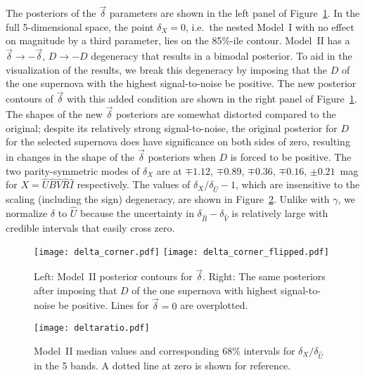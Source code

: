 \documentclass{aastex61}   	%
\begin{document}
The posteriors of the $\vec{\delta}$ parameters are shown  in
the left panel of
Figure~\ref{deltacorner:fig}.
In the full 5-dimensional space,
the point $\delta_X=0$, i.e.\ the nested Model~I with no effect on magnitude by a third parameter,  lies on the 85\%-ile contour.
Model~II has a  $\vec{\delta} \rightarrow -\vec{\delta}$, $D \rightarrow -D$ degeneracy that results in a bimodal posterior.
To aid in the visualization of the results,
we break this degeneracy by imposing  that the $D$ of the one supernova with the highest signal-to-noise be positive.
The new posterior contours of $\vec{\delta}$ with this added
condition are shown in 
the right panel of
Figure~\ref{deltacorner:fig}.
The shapes of the new $\vec{\delta}$ posteriors are somewhat distorted compared to the original;
despite its relatively strong signal-to-noise, the original posterior for $D$ for the selected supernova does have significance on both sides of zero,
resulting in changes in the shape of the $\vec{\delta}$ posteriors when  $D$ is forced to be positive.   
The 
two parity-symmetric
modes of $\delta_X$ are at $\mp 1.12$, $\mp 0.89$, $\mp 0.36$,  $\mp0.16$, $\pm0.21$~mag
for $X={\hat{U}}{\hat{B}}{\hat{V}}{\hat{R}}{\hat{I}}$ respectively.
The values of $\delta_X/\delta_{\hat{U}}-1$, which are insensitive to the scaling (including the sign) degeneracy, are shown in Figure~\ref{deltaratio:fig}.
Unlike with $\gamma$, we normalize $\delta$ to $\hat{U}$ because the uncertainty in $\delta_{\hat{B}}-\delta_{\hat{V}}$ is relatively large with
credible intervals that easily cross zero. 

\begin{figure}[htbp] %
   \centering
   \texttt{[image: delta\_corner.pdf]}
     \texttt{[image: delta\_corner\_flipped.pdf]}
   \caption{Left:  Model~II posterior contours for $\vec{\delta}$.
   Right: The same posteriors after imposing that $D$ of the one supernova with highest signal-to-noise be positive.
     Lines for $\vec{\delta}=0$ are overplotted.
   \label{deltacorner:fig}}
\end{figure}


\begin{figure}[htbp] %
   \centering
      \texttt{[image: deltaratio.pdf]}
   \caption{Model~II median values  and corresponding 68\% intervals for $\delta_X/\delta_{\hat{U}}$ in the 5 bands.
   A dotted line at zero is shown for reference.
   \label{deltaratio:fig}}
\end{figure}
\end{document}
